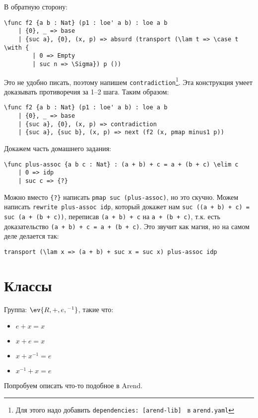 В обратную сторону:
\begin{verbatim}
\func f2 {a b : Nat} (p1 : loe' a b) : loe a b
    | {0}, _ => base
    | {suc a}, {0}, (x, p) => absurd (transport (\lam t => \case t \with {
        | 0 => Empty
        | suc n => \Sigma}) p ())
\end{verbatim}

Это не удобно писать, поэтому напишем \texttt{contradiction}\footnote{Для этого надо добавить \texttt{dependencies: [arend-lib]
} в \texttt{arend.yaml}}. Эта конструкция умеет доказывать противоречия за 1--2 шага. Таким образом:

\begin{verbatim}
\func f2 {a b : Nat} (p1 : loe' a b) : loe a b
    | {0}, _ => base
    | {suc a}, {0}, (x, p) => contradiction
    | {suc a}, {suc b}, (x, p) => next (f2 (x, pmap minus1 p))
\end{verbatim}

Докажем часть домашнего задания:
\begin{verbatim}
\func plus-assoc {a b c : Nat} : (a + b) + c = a + (b + c) \elim c
    | 0 => idp
    | suc c => {?}
\end{verbatim}

Можно вместо \texttt{\{?\}} написать \texttt{pmap suc (plus-assoc)}, но это скучно. Можем написать \texttt{rewrite plus-assoc idp}, который докажет нам \texttt{suc ((a + b) + c) = suc (a + (b + c))}, переписав \texttt{(a + b) + c} на \texttt{a + (b + c)}, т.к. есть доказательство \texttt{(a + b) + c = a + (b + c)}. Это звучит как магия, но на самом деле делается так:
\begin{verbatim}
transport (\lam x => (a + b) + suc x = suc x) plus-assoc idp
\end{verbatim}

\section{Классы}

\begin{example}
    Группа: \(\ev{R, +, e, {}^{-1}}\), такие что:
    \begin{itemize}
        \item \(e + x = x\)
        \item \(x + e = x\)
        \item \(x + x^{-1} = e\)
        \item \(x^{-1} + x = e\)
    \end{itemize}

    Попробуем описать что-то подобное в Arend.
\end{example}

